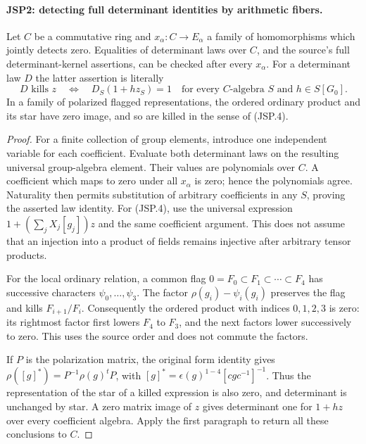 \paragraph{JSP2: detecting full determinant identities by arithmetic fibers.}
\label{claim:JSP2}
Let $C$ be a commutative ring and $x_\alpha:C\to E_\alpha$ a
family of homomorphisms which jointly detects zero. Equalities of
determinant laws over $C$, and the source's full determinant-kernel
assertions, can be checked after every $x_\alpha$.
For a determinant law $D$ the latter assertion is literally
\[
 D\text{ kills }z
 \quad\Longleftrightarrow\quad
 D_S(1+h z_S)=1
 \quad\text{for every }C\text{-algebra }S\text{ and }h\in S[G_0].
 \tag{JSP.4}
\]
In a family of polarized flagged representations, the ordered
ordinary product and its star have zero image, and so are killed
in the sense of (JSP.4).
\begin{proof}
For a finite collection of group elements, introduce one independent
variable for each coefficient. Evaluate both determinant laws on
the resulting universal group-algebra element. Their values are
polynomials over $C$. A coefficient which maps to zero under all
$x_\alpha$ is zero; hence the polynomials agree. Naturality then
permits substitution of arbitrary coefficients in any $S$, proving
the asserted law identity. For (JSP.4), use the universal expression
$1+(\sum_j X_j[g_j])z$ and the same coefficient argument. This
does not assume that an injection into a product of fields remains
injective after arbitrary tensor products.

For the local ordinary relation, a common flag
$0=F_0\subset F_1\subset\cdots\subset F_4$ has successive
characters $\psi_0,\ldots,\psi_3$. The factor
$\rho(g_i)-\psi_i(g_i)$ preserves the flag and kills
$F_{i+1}/F_i$. Consequently the ordered product with indices
$0,1,2,3$ is zero: its rightmost factor first lowers $F_4$ to
$F_3$, and the next factors lower successively to zero.
This uses the source order and does not commute the factors.

If $P$ is the polarization matrix, the original form identity
gives
$\rho([g]^*)=P^{-1}\rho(g)^tP$, with
$[g]^*=\epsilon(g)^{1-4}[cgc^{-1}]^{-1}$.
Thus the representation of the star of a killed expression is
also zero, and determinant is unchanged by star. A zero matrix
image of $z$ gives determinant one for $1+h z$ over every
coefficient algebra. Apply the first paragraph to return all
these conclusions to $C$.
\end{proof}

